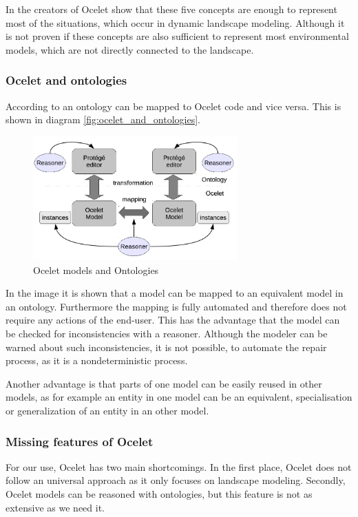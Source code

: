 \par
In \autocite{dsl:ocelet-design} the creators of Ocelet show that these five concepts are enough to represent most of the situations, which occur in dynamic landscape modeling. Although it is not proven if these concepts are also sufficient to represent most environmental models, which are not directly connected to the landscape.

\subsubsection{Ocelet and ontologies}
\par
According to \autocite{dsl:ocelet-design} an ontology can be mapped to Ocelet code and vice versa. This is shown in diagram \vref{fig:ocelet_and_ontologies}.
\begin{figure}[h]
	\centering
	\includegraphics[width=0.7\textwidth]{pics/ocelet/ocelet_and_ontologies.png}
	\caption{Ocelet models and Ontologies  \label{fig:ocelet_and_ontologies}}	
\end{figure}
\par
In the image it is shown that a model can be mapped to an equivalent model in an ontology. Furthermore the mapping is fully automated and therefore does not require any actions of the end-user. This has the advantage that the model can be checked for inconsistencies with a reasoner. Although the modeler can be warned about such inconsistencies, it is not possible, to automate the repair process, as it is a nondeterministic process.  
\par
Another advantage is that parts of one model can be easily reused in other models, as for example an entity in one model can be an equivalent, specialisation or generalization of an entity in an other model.

\subsubsection{Missing features of Ocelet}
\par
For our use, Ocelet has two main shortcomings. In the first place, Ocelet does not follow an universal approach as it only focuses on landscape modeling. Secondly, Ocelet models can be reasoned with ontologies, but this feature is not as extensive as we need it.

